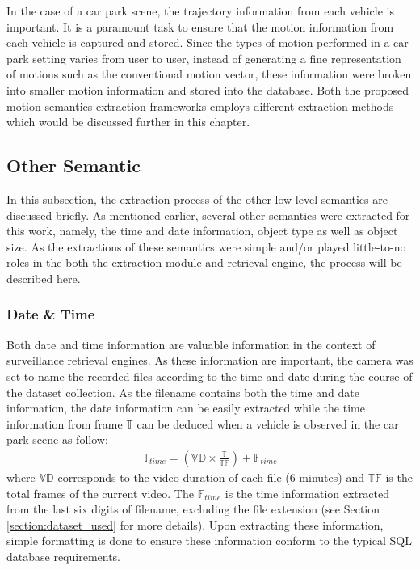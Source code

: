 In the case of a car park scene, the trajectory information from each vehicle is important. It is a paramount task to ensure that the motion information from each vehicle is captured and stored. Since the types of motion performed in a car park setting varies from user to user, instead of generating a fine representation of motions such as the conventional motion vector, these information were broken into smaller motion information and stored into the database. Both the proposed motion semantics extraction frameworks employs different extraction methods which would be discussed further in this chapter.






\subsection{Other Semantic}

In this subsection, the extraction process of the other low level semantics are discussed briefly. As mentioned earlier, several other semantics were extracted for this work, namely, the time and date information, object type as well as object size. As the extractions of these semantics were simple and/or played little-to-no roles in the both the extraction module and retrieval engine, the process will be described here.

\subsubsection{Date \& Time}

Both date and time information are valuable information in the context of surveillance retrieval engines. As these information are important, the camera was set to name the recorded files according to the time and date during the course of the dataset collection. As the filename contains both the time and date information, the date information can be easily extracted while the time information from frame $\mathbb{T}$ can be deduced when a vehicle is observed in the car park scene as follow: 
\begin{align}
    \mathbb{T}_{time}  = (\mathbb{VD} \times \frac{\mathbb{T}}{\mathbb{TF}}) + \mathbb{F}_{time}
\end{align}
where $\mathbb{VD}$ corresponds to the video duration of each file (6 minutes) and $\mathbb{TF}$ is the total frames of the current video. The $\mathbb{F}_{time}$ is the time information extracted from the last six digits of filename, excluding the file extension (see Section \ref{section:dataset_used} for more details). Upon extracting these information, simple formatting is done to ensure these information conform to the typical SQL database requirements.

